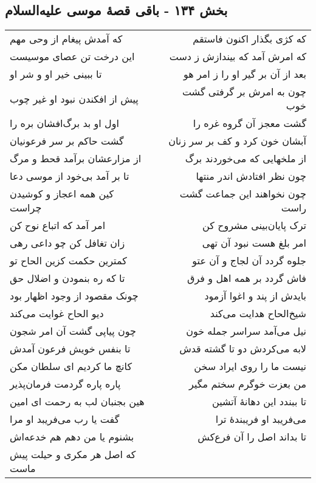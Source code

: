 \begin{center}
\section*{بخش ۱۳۴ - باقی قصهٔ موسی علیه‌السلام}
\label{sec:sh134}
\begin{longtable}{l p{0.5cm} r}
که آمدش پیغام از وحی مهم
&&
که کژی بگذار اکنون فاستقم
\\
این درخت تن عصای موسیست
&&
که امرش آمد که بیندازش ز دست
\\
تا ببینی خیر او و شر او
&&
بعد از آن بر گیر او را ز امر هو
\\
پیش از افکندن نبود او غیر چوب
&&
چون به امرش بر گرفتی گشت خوب
\\
اول او بد برگ‌افشان بره را
&&
گشت معجز آن گروه غره را
\\
گشت حاکم بر سر فرعونیان
&&
آبشان خون کرد و کف بر سر زنان
\\
از مزارعشان برآمد قحط و مرگ
&&
از ملخهایی که می‌خوردند برگ
\\
تا بر آمد بی‌خود از موسی دعا
&&
چون نظر افتادش اندر منتها
\\
کین همه اعجاز و کوشیدن چراست
&&
چون نخواهند این جماعت گشت راست
\\
امر آمد که اتباع نوح کن
&&
ترک پایان‌بینی مشروح کن
\\
زان تغافل کن چو داعی رهی
&&
امر بلغ هست نبود آن تهی
\\
کمترین حکمت کزین الحاح تو
&&
جلوه گردد آن لجاج و آن عتو
\\
تا که ره بنمودن و اضلال حق
&&
فاش گردد بر همه اهل و فرق
\\
چونک مقصود از وجود اظهار بود
&&
بایدش از پند و اغوا آزمود
\\
دیو الحاح غوایت می‌کند
&&
شیخ‌الحاح هدایت می‌کند
\\
چون پیاپی گشت آن امر شجون
&&
نیل می‌آمد سراسر جمله خون
\\
تا بنفس خویش فرعون آمدش
&&
لابه می‌کردش دو تا گشته قدش
\\
کانچ ما کردیم ای سلطان مکن
&&
نیست ما را روی ایراد سخن
\\
پاره پاره گردمت فرمان‌پذیر
&&
من بعزت خوگرم سختم مگیر
\\
هین بجنبان لب به رحمت ای امین
&&
تا ببندد این دهانهٔ آتشین
\\
گفت یا رب می‌فریبد او مرا
&&
می‌فریبد او فریبندهٔ ترا
\\
بشنوم یا من دهم هم خدعه‌اش
&&
تا بداند اصل را آن فرع‌کش
\\
که اصل هر مکری و حیلت پیش ماست

\end{longtable}
\end{center}
